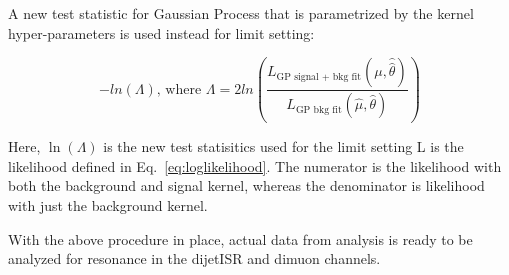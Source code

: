     A new test statistic for Gaussian Process that is parametrized by the kernel hyper-parameters is used instead for limit setting:

\begin{equation}
    -ln(\Lambda) \textrm{, where }\Lambda= 2ln(\frac{L_{\textrm{GP signal + bkg fit}}(\mu, \hat{\hat{\theta}})}{L_{\textrm{GP bkg fit}}(\hat{\mu}, \hat{\theta})})
\end{equation}

Here, $\ln(\Lambda)$ is the new test statisitics used for the limit setting L is the likelihood defined in Eq.~\ref{eq:loglikelihood}. The numerator is the likelihood with both the background and signal kernel, whereas the denominator is likelihood with just the background kernel. 

With the above procedure in place, actual data from analysis is ready to be analyzed for resonance in the dijetISR and dimuon channels.

